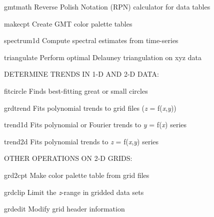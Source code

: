 \documentclass{article}
\begin{document}
\par 	gmtmath	Reverse Polish Notation (RPN) calculator for data tables\par 

\par 	makecpt	Create GMT color palette tables\par 

\par 	spectrum1d	Compute spectral estimates from time-series\par 

\par 	triangulate	Perform optimal Delauney triangulation on xyz data\par 

\par \par 

\par DETERMINE TRENDS IN 1-D AND 2-D DATA:\par 

\par 	fitcircle	Finds best-fitting great or small circles\par 

\par 	grdtrend	Fits polynomial trends to grid files (\emph{z} = f(\emph{x},\emph{y}))\par 

\par 	trend1d	Fits polynomial or Fourier trends to \emph{y} = f(\emph{x}) series\par 

\par 	trend2d	Fits polynomial trends to \emph{z} = f(\emph{x},\emph{y}) series\par 

\par \par 

\par OTHER OPERATIONS ON 2-D GRIDS:\par 

\par 	grd2cpt	Make color palette table from grid files\par 

\par 	grdclip	Limit the \emph{z}-range in gridded data sets\par 

\par 	grdedit	Modify grid header information\par 
\end{document}
